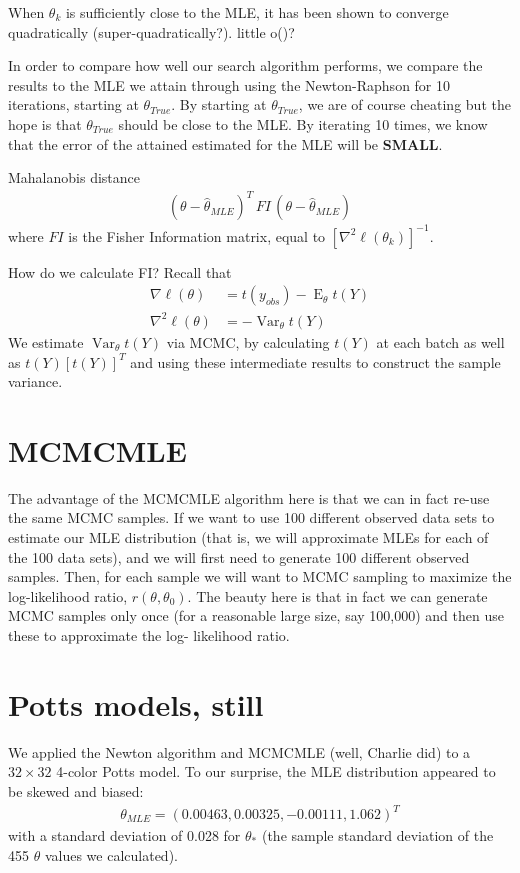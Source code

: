 \documentclass{amsbook}
\DeclareMathOperator{\E}{E}
\DeclareMathOperator{\Var}{Var}
\theoremstyle{definition}
\theoremstyle{remark}
\begin{document}
When $\theta_k$ is sufficiently close to the MLE, it has been shown to converge 
quadratically (super-quadratically?).  little o()?  

In order to compare how well our search algorithm performs, we compare the results to 
the MLE we attain through using the Newton-Raphson for 10 iterations, starting at $
\theta_{True}$.  By starting at $\theta_{True}$, we are of course cheating but the 
hope is that $\theta_{True}$ should be close to the MLE.  By iterating 10 times, we 
know that the error of the attained estimated for the MLE will be \textbf{SMALL}.

Mahalanobis distance
\begin{align*}
	( \theta - \hat{\theta}_{MLE} )^T \, FI \, ( \theta - \hat{\theta}_{MLE} )
\end{align*}
where $FI$ is the Fisher Information matrix, equal to $\left [  \nabla^2 \ell 
(\theta_k) \right ]^{-1}$.

How do we calculate FI?
Recall that 
\begin{align*}
	\nabla \ell (\theta) &= t(y_{obs}) - \E_{\theta} t(Y) \\
	\nabla^2 \ell (\theta) &= - \Var_{\theta} t(Y)
\end{align*}
We estimate $\Var_{\theta} t(Y)$ via MCMC, by calculating $t(Y)$ at each batch as 
well as $t(Y) [t(Y)]^T$ and using these intermediate results to construct the sample 
variance.

\section{MCMCMLE}
The advantage of the MCMCMLE algorithm here is that we can in fact re-use the same 
MCMC samples.  If we want to use 100 different observed data sets to estimate our MLE 
distribution (that is, we will approximate MLEs for each of the 100 data sets), and 
we will first need to generate 100 different observed samples.  Then, for each sample 
we will want to MCMC sampling to maximize the log-likelihood ratio, $r( \theta, 
\theta_0)$.  The beauty here is that in fact we can generate MCMC samples only once 
(for a reasonable large size, say 100,000) and then use these to approximate the log-
likelihood ratio.

\section{Potts models, still}
We applied the Newton algorithm and MCMCMLE (well, Charlie did) to a $32 \times 32$ 
4-color Potts model.  To our surprise, the MLE distribution appeared to be skewed and 
biased:
\begin{align*}
\theta_{MLE} = (0.00463, 0.00325, -0.00111, 1.062 )^T
\end{align*}
with a standard deviation of 0.028 for $\theta_*$ (the sample standard deviation of 
the 455 $\theta$ values we calculated).
\end{document}
